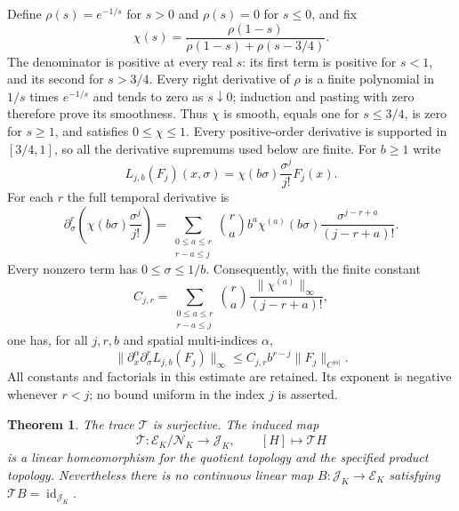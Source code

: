 \documentclass[10pt,a4paper]{article}
\newtheorem{theorem}{Theorem}[section]\newtheorem{proposition}[theorem]{Proposition}
\newcommand{\J}{\mathcal J_K}
\newcommand{\E}{\mathcal E_K}
\newcommand{\N}{\mathcal N_K}
\begin{document}
Define $\rho(s)=e^{-1/s}$ for $s>0$ and $\rho(s)=0$ for $s\le0$, and fix
\[
 \chi(s)=\frac{\rho(1-s)}{\rho(1-s)+\rho(s-3/4)}.
\]
The denominator is positive at every real $s$: its first term is positive
for $s<1$, and its second for $s>3/4$. Every right derivative of $\rho$
is a finite polynomial in $1/s$ times $e^{-1/s}$ and tends to zero as
$s\downarrow0$; induction and pasting with zero therefore prove its smoothness.
Thus $\chi$ is smooth, equals one for $s\le3/4$, is zero for $s\ge1$,
and satisfies $0\le\chi\le1$. Every positive-order derivative is supported
in $[3/4,1]$, so all the derivative supremums used below are finite.
For $b\ge1$ write
\[
 L_{j,b}(F_j)(x,\sigma)
       =\chi(b\sigma)\frac{\sigma^j}{j!}F_j(x).
\]
For each $r$ the full temporal derivative is
\[
 \partial_\sigma^r\left(\chi(b\sigma)\frac{\sigma^j}{j!}\right)
 =\sum_{\substack{0\le a\le r\\r-a\le j}}
   \binom{r}{a}b^a\chi^{(a)}(b\sigma)
                    \frac{\sigma^{j-r+a}}{(j-r+a)!}.
 \tag{T.2}
\]
Every nonzero term has $0\le\sigma\le1/b$. Consequently, with the finite
constant
\[
 C_{j,r}=\sum_{\substack{0\le a\le r\\r-a\le j}}
      \binom{r}{a}\frac{\|\chi^{(a)}\|_\infty}{(j-r+a)!},
\]
one has, for all $j,r,b$ and spatial multi-indices $\alpha$,
\[
 \|\partial_x^\alpha\partial_\sigma^rL_{j,b}(F_j)\|_\infty
 \le C_{j,r}b^{r-j}\|F_j\|_{C^{|\alpha|}}.
 \tag{T.3}
\]
All constants and factorials in this estimate are retained. Its exponent is
negative whenever $r<j$; no bound uniform in the index $j$ is asserted.

\begin{theorem}
The trace $\mathcal T$ is surjective. The induced map
\[
 \overline{\mathcal T}:\E/\N\longrightarrow\J,\qquad
 [H]\longmapsto\mathcal T H
\]
is a linear homeomorphism for the quotient topology and the specified product
topology. Nevertheless there is no continuous linear map
$B:\J\to\E$ satisfying $\mathcal T B=\operatorname{id}_{\J}$.
\end{theorem}
\end{document}
